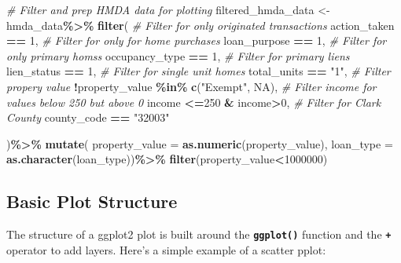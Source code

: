 \documentclass[
]{book}
\newenvironment{Shaded}{\begin{snugshade}}{\end{snugshade}}
\newcommand{\AttributeTok}[1]{\textcolor[rgb]{0.13,0.29,0.53}{#1}}
\newcommand{\CommentTok}[1]{\textcolor[rgb]{0.56,0.35,0.01}{\textit{#1}}}
\newcommand{\ConstantTok}[1]{\textcolor[rgb]{0.56,0.35,0.01}{#1}}
\newcommand{\DecValTok}[1]{\textcolor[rgb]{0.00,0.00,0.81}{#1}}
\newcommand{\FunctionTok}[1]{\textcolor[rgb]{0.13,0.29,0.53}{\textbf{#1}}}
\newcommand{\NormalTok}[1]{#1}
\newcommand{\OtherTok}[1]{\textcolor[rgb]{0.56,0.35,0.01}{#1}}
\newcommand{\SpecialCharTok}[1]{\textcolor[rgb]{0.81,0.36,0.00}{\textbf{#1}}}
\newcommand{\StringTok}[1]{\textcolor[rgb]{0.31,0.60,0.02}{#1}}
\begin{document}
\begin{Shaded}
\begin{Highlighting}[]
\CommentTok{\# Filter and prep HMDA data for plotting}
\NormalTok{filtered\_hmda\_data }\OtherTok{\textless{}{-}}\NormalTok{ hmda\_data}\SpecialCharTok{\%\textgreater{}\%}
  \FunctionTok{filter}\NormalTok{(}
    \CommentTok{\# Filter for only originated transactions}
\NormalTok{    action\_taken }\SpecialCharTok{==} \DecValTok{1}\NormalTok{,}
    \CommentTok{\# Filter for only for home purchases}
\NormalTok{    loan\_purpose }\SpecialCharTok{==} \DecValTok{1}\NormalTok{,}
    \CommentTok{\# Filter for only primary homss}
\NormalTok{    occupancy\_type }\SpecialCharTok{==} \DecValTok{1}\NormalTok{,}
    \CommentTok{\# Filter for primary liens}
\NormalTok{    lien\_status }\SpecialCharTok{==} \DecValTok{1}\NormalTok{,}
    \CommentTok{\# Filter for single unit homes}
\NormalTok{    total\_units }\SpecialCharTok{==} \StringTok{"1"}\NormalTok{,}
    \CommentTok{\# Filter propery value }
    \SpecialCharTok{!}\NormalTok{property\_value }\SpecialCharTok{\%in\%} \FunctionTok{c}\NormalTok{(}\StringTok{"Exempt"}\NormalTok{, }\ConstantTok{NA}\NormalTok{),}
    \CommentTok{\# Filter income for values below 250 but above 0}
\NormalTok{    income }\SpecialCharTok{\textless{}=}\DecValTok{250} \SpecialCharTok{\&}\NormalTok{ income}\SpecialCharTok{\textgreater{}}\DecValTok{0}\NormalTok{,}
    \CommentTok{\# Filter for Clark County}
\NormalTok{    county\_code }\SpecialCharTok{==} \StringTok{"32003"}
    
\NormalTok{  )}\SpecialCharTok{\%\textgreater{}\%}
  \FunctionTok{mutate}\NormalTok{(}
    \AttributeTok{property\_value =} \FunctionTok{as.numeric}\NormalTok{(property\_value),}
    \AttributeTok{loan\_type =} \FunctionTok{as.character}\NormalTok{(loan\_type))}\SpecialCharTok{\%\textgreater{}\%}
  \FunctionTok{filter}\NormalTok{(property\_value}\SpecialCharTok{\textless{}}\DecValTok{1000000}\NormalTok{)}
\end{Highlighting}
\end{Shaded}

\hypertarget{basic-plot-structure}{%
\subsection{Basic Plot Structure}\label{basic-plot-structure}}

The structure of a ggplot2 plot is built around the \textbf{\texttt{ggplot()}} function and the \textbf{\texttt{+}} operator to add layers. Here's a simple example of a scatter pplot:
\end{document}
